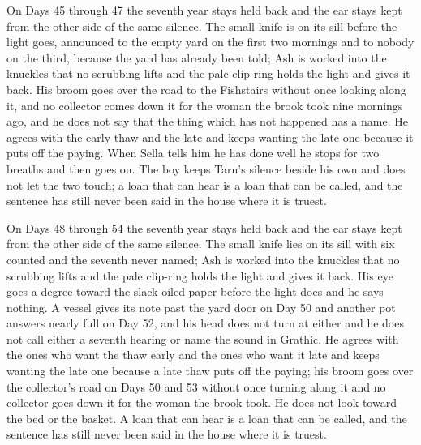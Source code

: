 \documentclass{design/chronicle}
\begin{document}
{On Days 45 through 47 the seventh year stays held back and the ear stays kept from the other side of the same silence. The small knife is on its sill before the light goes, announced to the empty yard on the first two mornings and to nobody on the third, because the yard has already been told; Ash is worked into the knuckles that no scrubbing lifts and the pale clip-ring holds the light and gives it back. His broom goes over the road to the Fishstairs without once looking along it, and no collector comes down it for the woman the brook took nine mornings ago, and he does not say that the thing which has not happened has a name. He agrees with the early thaw and the late and keeps wanting the late one because it puts off the paying. When Sella tells him he has done well he stops for two breaths and then goes on. The boy keeps Tarn’s silence beside his own and does not let the two touch; a loan that can hear is a loan that can be called, and the sentence has still never been said in the house where it is truest.

On Days 48 through 54 the seventh year stays held back and the ear stays kept from the other side of the same silence. The small knife lies on its sill with six counted and the seventh never named; Ash is worked into the knuckles that no scrubbing lifts and the pale clip-ring holds the light and gives it back. His eye goes a degree toward the slack oiled paper before the light does and he says nothing. A vessel gives its note past the yard door on Day 50 and another pot answers nearly full on Day 52, and his head does not turn at either and he does not call either a seventh hearing or name the sound in Grathic. He agrees with the ones who want the thaw early and the ones who want it late and keeps wanting the late one because a late thaw puts off the paying; his broom goes over the collector’s road on Days 50 and 53 without once turning along it and no collector goes down it for the woman the brook took. He does not look toward the bed or the basket. A loan that can hear is a loan that can be called, and the sentence has still never been said in the house where it is truest.

}
\end{document}
